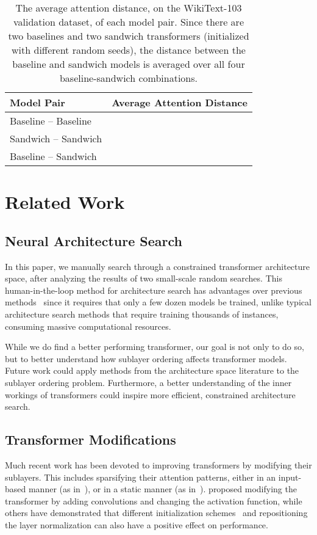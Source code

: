 \documentclass[11pt,a4paper]{article}
\begin{document}
\begin{table}[t]
\centering
\small
\begin{tabular}{@{}ll@{}}
\toprule
\textbf{Model Pair} & \textbf{Average Attention Distance} \\
\midrule
Baseline -- Baseline &  \\
Sandwich  -- Sandwich &  \\
Baseline -- Sandwich & \\
\bottomrule
\end{tabular}
\caption{The average attention distance, on the WikiText-103 validation dataset, of each model pair. Since there are two baselines and two sandwich transformers (initialized with different random seeds), the distance between the baseline and sandwich models is averaged over all four baseline-sandwich combinations. }
\label{tab.analysis}
\end{table} \section{Related Work}

\subsection{Neural Architecture Search}
In this paper, we manually search through a constrained transformer architecture space, after analyzing the results of two small-scale random searches. This human-in-the-loop method for architecture search has advantages over previous methods~\cite{jozefowicz2015empirical,zoph2016neural,efficientnet} since it requires that only a few dozen models be trained, unlike typical architecture search methods that require training thousands of instances, consuming massive computational resources.

While we do find a better performing transformer, our goal is not only to do so, but to better understand how sublayer ordering affects transformer models. Future work could apply methods from the architecture space literature to the sublayer ordering problem. Furthermore, a better understanding of the inner workings of transformers could inspire more efficient, constrained architecture search.

\subsection{Transformer Modifications}
Much recent work has been devoted to improving transformers by modifying their sublayers. This includes sparsifying their attention patterns, either in an input-based manner (as in~\citealp{correia2019adaptively}), or in a static manner (as in~\citealp{startransformer}). \citet{evolvedtransformer} proposed modifying the transformer by adding convolutions and changing the activation function, while others have demonstrated that different initialization schemes~\cite{zhang2019improving} and repositioning the layer normalization \cite{nguyen2019transformers} can also have a positive effect on performance. 
\end{document}
